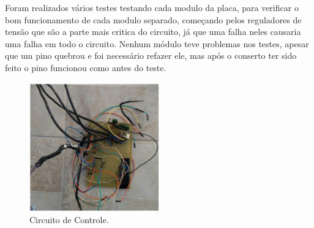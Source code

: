 Foram realizados vários testes testando cada modulo da placa, para verificar o bom funcionamento de cada modulo separado, começando pelos reguladores de tensão que são a parte mais critica do circuito, já que uma falha neles causaria uma falha em todo o circuito. Nenhum módulo teve problemas nos testes, apesar que um pino quebrou e foi necessário refazer ele, mas após o conserto ter sido feito o pino funcionou como antes do teste.

\begin{figure}[h]
  \centering
  \includegraphics[width=0.5\textwidth]{figuras/circuit-real.png}
  \caption{Circuito de Controle.}
  \label{fig:circuit-real}
\end{figure}
\FloatBarrier